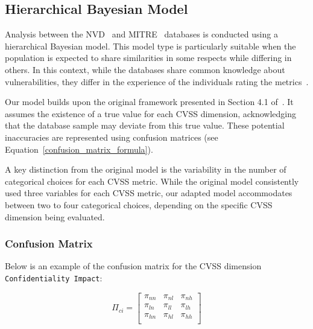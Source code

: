 \documentclass[12pt]{article}
\begin{document}




\subsection{Hierarchical Bayesian Model} \label{bayesian_modeling}

Analysis between the NVD~\cite{NVD} and MITRE~\cite{MITRE} databases is conducted using a
hierarchical Bayesian model. This model type is particularly suitable when the population is
expected to share similarities in some respects while differing in others. In this context, while
the databases share common knowledge about vulnerabilities, they differ in the experience of the
individuals rating the metrics~\cite{bayes}.

Our model builds upon the original framework presented in Section 4.1 of~\cite{bayes}. It assumes
the existence of a true value for each CVSS dimension, acknowledging that the database sample may
deviate from this true value. These potential inaccuracies are represented using confusion matrices
(see Equation~\ref{confusion_matrix_formula}).

A key distinction from the original model is the variability in the number of categorical choices
for each CVSS metric. While the original model consistently used three variables for each CVSS
metric, our adapted model accommodates between two to four categorical choices, depending on the
specific CVSS dimension being evaluated.

\subsubsection{Confusion Matrix}

Below is an example of the confusion matrix for the CVSS dimension \texttt{Confidentiality Impact}:

\begin{equation}\label{confusion_matrix_formula}
	\Pi_{ci} = \begin{bmatrix}
		\pi_{nn} & \pi_{nl} & \pi_{nh} \\
		\pi_{ln} & \pi_{ll} & \pi_{lh} \\
		\pi_{hn} & \pi_{hl} & \pi_{hh} \\
	\end{bmatrix}
\end{equation}
\end{document}
